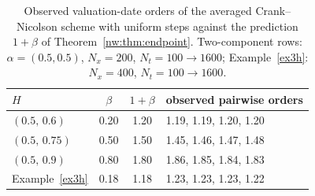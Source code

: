 \begin{table}[htbp]
\centering
\small
\caption{Observed valuation-date orders of the averaged Crank--Nicolson scheme with uniform steps against the prediction $1+\beta$ of Theorem~\ref{nw:thm:endpoint}.  Two-component rows: $\alpha=(0.5,0.5)$, $N_x=200$, $N_t=100\to1600$; Example~\ref{ex3h}: $N_x=400$, $N_t=100\to1600$.}
\label{tab:beta}
\begin{tabular}{lccl}
\toprule
$H$ & $\beta$ & $1+\beta$ & observed pairwise orders \\
\midrule
$(0.5,\,0.6)$ & 0.20 & 1.20 & 1.19, 1.19, 1.20, 1.20 \\
$(0.5,\,0.75)$ & 0.50 & 1.50 & 1.45, 1.46, 1.47, 1.48 \\
$(0.5,\,0.9)$ & 0.80 & 1.80 & 1.86, 1.85, 1.84, 1.83 \\
Example~\ref{ex3h} & 0.18 & 1.18 & 1.23, 1.23, 1.23, 1.22 \\
\bottomrule
\end{tabular}
\end{table}
